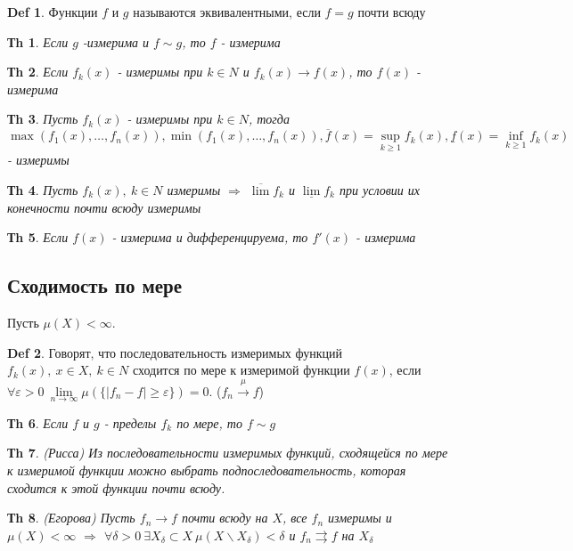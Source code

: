 \documentclass[14pt]{article}
\theoremstyle{plain}
\newtheorem{Thm}{Тh}
\theoremstyle{definition}
\newtheorem{Def}{Def}
\begin{document}
	\begin{Def}
		Функции $f$ и $g$ называются эквивалентными, если $f = g$ почти всюду
	\end{Def}
	\begin{Thm}
		Если $g$ -измерима и $f \sim g$, то $f$ - измерима
	\end{Thm}
	\begin{Thm}
		Если $f_k(x)$ - измеримы при $k \in N$ и $f_k(x) \to f(x)$, то $f(x)$ - измерима
	\end{Thm}
	\begin{Thm}
		Пусть $f_k(x)$ - измеримы при $k \in N$, тогда $\max{ \left( f_1(x), \dots , f_n(x) \right)}, \min{\left( f_1(x), \dots, f_n(x) \right)}, \overline{f}(x)  = \sup\limits_{k \geq 1} f_k(x), \underline{f}(x) = \inf\limits_{k \geq 1} f_k(x)$ - измеримы
	\end{Thm}
	\begin{Thm}
		Пусть $f_k(x), \ k \in N$  измеримы $\Rightarrow$ $\overline{\lim} f_k$ и $\underline{\lim} f_k$ при условии их конечности почти всюду измеримы
	\end{Thm}
	\begin{Thm}
		Если $f(x)$ - измерима и дифференцируема, то $f'(x)$ - измерима	
	\end{Thm}
	\subsection{Сходимость по мере}
		Пусть $\mu(X) < \infty$.
		\begin{Def}
			Говорят, что последовательность измеримых функций $f_k(x), \ x\in X, \ k \in N$ сходится по мере к измеримой функции $f(x)$, если $\forall \varepsilon > 0 \ \lim\limits_{n \to \infty} \mu \left( \{|f_n - f| \geq \varepsilon\} \right)	=0$. ($f_n \xrightarrow{\mu} f$)
		\end{Def}
		\begin{Thm}
			Если $f$ и $g$ - пределы $f_k$ по мере, то $f \sim g$
		\end{Thm}
		\begin{Thm}
			(Рисса)\newline
				Из последовательности измеримых функций, сходящейся по мере к измеримой функции можно выбрать подпоследовательность, которая сходится к этой функции почти всюду. 
		\end{Thm}
		\begin{Thm}
			(Егорова) \newline
			Пусть $f_n \to f$ почти всюду на $X$, все $f_n$ измеримы и $\mu(X) < \infty$ $\Rightarrow$ $\forall \delta > 0 \ \exists X_\delta  \subset X \ \mu(X \backslash X_\delta) < \delta$ и $f_n \rightrightarrows f$ на $X_\delta$
		\end{Thm}
\end{document}
